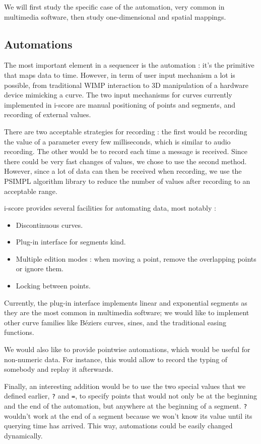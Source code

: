 \documentclass{sigchi}
\begin{document}
We will first study the specific case of the automation, very common in multimedia software, then study one-dimensional and spatial mappings.

\subsection{Automations}
The most important element in a sequencer is the automation : it's the primitive that maps data to time. However, in term of user input mechanism a lot is possible, from traditional WIMP interaction\cite{cohen1999interface} to 3D manipulation of a hardware device mimicking a curve\cite{grossman2003interface}. The two input mechanisms for curves currently implemented in i-score are manual positioning of points and segments, and recording of external values. 

There are two acceptable strategies for recording : the first would be recording the value of a parameter every few milliseconds, which is similar to audio recording. The other would be to record each time a message is received. Since there could be very fast changes of values, we chose to use the second method.
However, since a lot of data can then be received when recording, we use the PSIMPL\cite{psimpl} algorithm library to reduce the number of values after recording to an acceptable range.

i-score provides several facilities for automating data, most notably : 
\begin{itemize}
    \item Discontinuous curves.
    \item Plug-in interface for segments kind.
    \item Multiple edition modes : when moving a point, remove the overlapping points or ignore them.
    \item Locking between points.
\end{itemize}

Currently, the plug-in interface implements linear and exponential segments as they are the most common in multimedia software; we would like to implement other curve families like Béziers curves, sines, and the traditional easing functions\cite{hudson1993animation}.

We would also like to provide pointwise automations, which would be useful for non-numeric data. For instance, this would allow to record the typing of somebody and replay it afterwards.

Finally, an interesting addition would be to use the two special values that we defined earlier, \texttt{?} and \texttt{=}, to specify points that would not only be at the beginning and the end of the automation, but anywhere at the beginning of a segment. \texttt{?} wouldn't work at the end of a segment because we won't know its value until its querying time has arrived. This way, automations could be easily changed dynamically.
\end{document}
